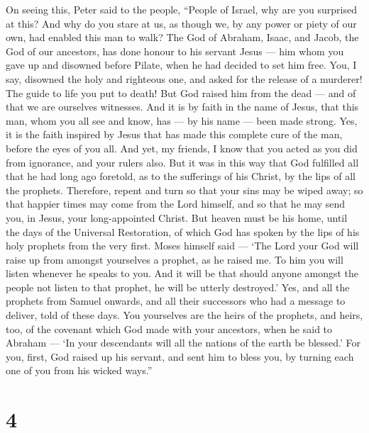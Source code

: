  On seeing this, Peter said to the people, ``People of
Israel, why are you surprised at this? And why do you stare at us, as
though we, by any power or piety of our own, had enabled this man to
walk?  The God of Abraham, Isaac, and Jacob, the God of our
ancestors, has done honour to his servant Jesus --- him whom you gave up
and disowned before Pilate, when he had decided to set him free.
 You, I say, disowned the holy and righteous one, and asked
for the release of a murderer!  The guide to life you put
to death! But God raised him from the dead --- and of that we are
ourselves witnesses.  And it is by faith in the name of
Jesus, that this man, whom you all see and know, has --- by his name ---
been made strong. Yes, it is the faith inspired by Jesus that has made
this complete cure of the man, before the eyes of you all. 
And yet, my friends, I know that you acted as you did from ignorance,
and your rulers also.  But it was in this way that God
fulfilled all that he had long ago foretold, as to the sufferings of his
Christ, by the lips of all the prophets.  Therefore, repent
and turn so that your sins may be wiped away; so that happier times may
come from the Lord himself,  and so that he may send you,
in Jesus, your long-appointed Christ.  But heaven must be
his home, until the days of the Universal Restoration, of which God has
spoken by the lips of his holy prophets from the very first.
 Moses himself said --- `The Lord your God will raise up
from amongst yourselves a prophet, as he raised me. To him you will
listen whenever he speaks to you.  And it will be that
should anyone amongst the people not listen to that prophet, he will be
utterly destroyed.'  Yes, and all the prophets from Samuel
onwards, and all their successors who had a message to deliver, told of
these days.  You yourselves are the heirs of the prophets,
and heirs, too, of the covenant which God made with your ancestors, when
he said to Abraham --- `In your descendants will all the nations of the
earth be blessed.'  For you, first, God raised up his
servant, and sent him to bless you, by turning each one of you from his
wicked ways.''

\hypertarget{section-3}{%
\section{4}\label{section-3}}

